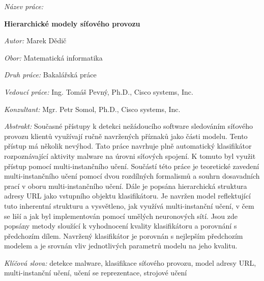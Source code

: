 \begin{onehalfspace}
	\noindent \textit{Název práce:}

	\noindent \textbf{Hierarchické modely síťového provozu}
\end{onehalfspace}

\bigskip

\noindent \textit{Autor:} Marek Dědič

\bigskip

\noindent \textit{Obor:} Matematická informatika

\bigskip

\noindent \textit{Druh práce:} Bakalářská práce

\bigskip

\noindent \textit{Vedoucí práce:} Ing. Tomáš Pevný, Ph.D., Cisco systems, Inc.

\bigskip

\noindent \textit{Konzultant:} Mgr. Petr Somol, Ph.D., Cisco systems, Inc.

\bigskip

\noindent \textit{Abstrakt:}
Současné přístupy k detekci nežádoucího software sledováním síťového provozu klientů využívají ručně navržených příznaků jako části modelu. Tento přístup má několik nevýhod. Tato práce navrhuje plně automatický klasifikátor rozpoznávající aktivity malware na úrovni síťových spojení. K tomuto byl využit přístup pomocí multi-instančního učení. Součástí této práce je teoretické zavedení multi-instančního učení pomocí dvou rozdílných formalismů a souhrn dosavadních prací v oboru multi-instančního učení. Dále je popsána hierarchická struktura adresy URL jako vstupního objektu klasifikátoru. Je navržen model reflektující tuto inherentní strukturu a vysvětleno, jak využívá multi-instanční učení, v čem se liší a jak byl implementován pomocí umělých neuronových sítí. Jsou zde popsány metody sloužící k vyhodnocení kvality klasifikátoru a porovnání s předchozím dílem. Navržený klasifikátor je porovnán s nejlepším předchozím modelem a je srovnán vliv jednotlivých parametrů modelu na jeho kvalitu.

\bigskip

\noindent \textit{Klíčová slova:}
detekce malware, klasifikace síťového provozu, model adresy URL, multi-instanční učení, učení se reprezentace, strojové učení

\vfill

